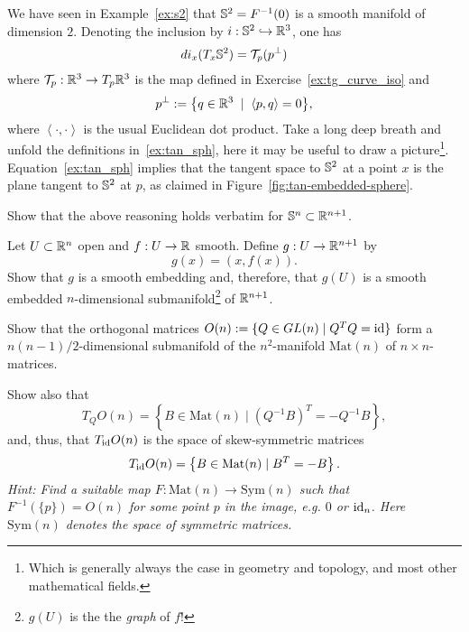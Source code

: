 \begin{example}
  We have seen in Example~\ref{ex:s2} that $\mathbb{S}^2 = F^{-1}(0)$ is a smooth manifold of dimension $2$.
  Denoting the inclusion by $i:\mathbb{S}^2 \hookrightarrow\mathbb{R}^3$, one has
  \begin{equation}\label{ex:tan_sph}
    di_x(T_x\mathbb{S}^2) = \mathcal{T}_p(p^\perp)
  \end{equation}
  where $\mathcal{T}_p:\mathbb{R}^3\to T_p\mathbb{R}^3$ is the map defined in Exercise~\ref{ex:tg_curve_iso} and
  \begin{equation}
    p^\perp := \big\{q\in\mathbb{R}^3 \;\mid\; \left\langle p, q\right\rangle = 0\big\},
  \end{equation}
  where $\left\langle\cdot,\cdot\right\rangle$ is the usual Euclidean dot product.
  Take a long deep breath and unfold the definitions in~\eqref{ex:tan_sph}, here it may be useful to draw a picture\footnote{Which is generally always the case in geometry and topology, and most other mathematical fields.}. 
  Equation~\eqref{ex:tan_sph} implies that the tangent space to $\mathbb{S}^2$ at a point $x$  is the plane tangent to $\mathbb{S}^2$ at $p$, as claimed in Figure~\ref{fig:tan-embedded-sphere}.
\end{example}

\begin{exercise}
  Show that the above reasoning holds verbatim for $\mathbb{S}^n\subset\mathbb{R}^{n+1}$.
\end{exercise}

\begin{exercise}
  Let $U\subset\mathbb{R}^n$ open and $f:U\to\mathbb{R}$ smooth.
  Define $g:U\to\mathbb{R}^{n+1}$ by
  \begin{equation}
    g(x) = (x, f(x)).
  \end{equation} 
  Show that $g$ is a smooth embedding and, therefore, that $g(U)$ is a smooth embedded $n$-dimensional submanifold\footnote{$g(U)$ is the the \emph{graph} of $f$!} of $\mathbb{R}^{n+1}$.
\end{exercise}

\begin{exercise}[\textit{[homework 2]}]\label{exe:onsubmanifold}
  Show that the orthogonal matrices $O(n) := \{ Q\in GL(n) \mid Q^TQ=\operatorname{id} \}$ form a $n(n-1)/2$-dimensional submanifold of the $n^2$-manifold $\mathrm{Mat}(n)$ of $n\times n$-matrices.

  Show also that
  \begin{equation}
    T_Q O(n) = \left\lbrace B \in \mathrm{Mat}(n) \mid (Q^{-1} B)^T = -Q^{-1}B \right\rbrace,
  \end{equation}
  and, thus, that $T_{\operatorname{id}} O(n)$ is the space of skew-symmetric matrices
  \begin{equation}
    T_{\operatorname{id}} O(n) = \left\{ B \in \mathrm{Mat}(n) \mid B^T = -B \right\}.
  \end{equation}
  \textit{\small Hint: Find a suitable map $F: \mathrm{Mat}(n) \to \mathrm{Sym}(n)$ such that $F^{-1}(\{p\}) = O(n)$ for some point $p$ in the image, e.g. $0$ or $\operatorname{id}_n$.
  Here $\mathrm{Sym}(n)$ denotes the space of symmetric matrices.}
\end{exercise}
